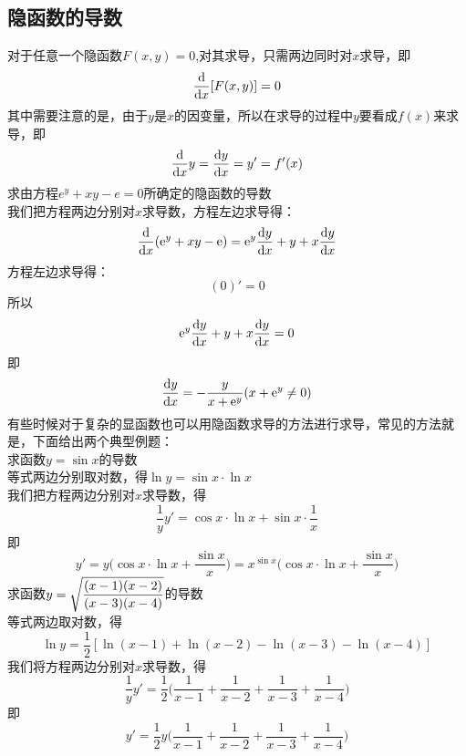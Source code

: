\subsection{隐函数的导数}
对于任意一个隐函数$F(x,y)=0$,对其求导，只需两边同时对$x$求导，即
\begin{equation}
	\frac{{\rm{d}}}{{\rm{d}} x}[F(x,y)]=0
\end{equation}
其中需要注意的是，由于$y$是$x$的因变量，所以在求导的过程中$y$要看成$f(x)$来求导，即
\begin{equation}
\frac{{\rm{d}}}{{\rm{d}} x}y=\frac{{\rm{d}} y}{{\rm{d}} x}=y'=f'(x)
\end{equation}
\examples 求由方程$e^y+xy-e=0$所确定的隐函数的导数
\\ \solve 我们把方程两边分别对$x$求导数，方程左边求导得：
\begin{equation}
	\nonumber
\frac{{\rm{d}}}{{\rm{d}} x}({\rm{e}}^y+xy-{\rm{e}})={\rm{e}}^y\frac{{\rm{d}} y}{{\rm{d}} x}+y+x\frac{{\rm{d}} y}{{\rm{d}} x}
\end{equation}
方程左边求导得：
\begin{equation}
	\nonumber
(0)'=0
\end{equation}
所以
\begin{equation}
	\nonumber
	{\rm{e}}^y\frac{{\rm{d}} y}{{\rm{d}} x}+y+x\frac{{\rm{d}} y}{{\rm{d}} x}=0
\end{equation}
即\begin{equation}
	\frac{{\rm{d}} y}{{\rm{d}} x}=-\frac{y}{x+{\rm{e}}^y}(x+{\rm{e}}^y\neq0)
\end{equation}
\kg 有些时候对于复杂的显函数也可以用隐函数求导的方法进行求导，常见的方法就是，下面给出两个典型例题：\vspace*{0.5em}\\
\examples 求函数$y=\sin x$的导数
\\ \solve 等式两边分别取对数，得$\ln y=\sin x\cdot \ln x$
\\我们把方程两边分别对$x$求导数，得
\begin{equation}
	\nonumber
\frac{1}{y}y'=\cos x\cdot \ln x+\sin x\cdot \frac{1}{x}
\end{equation}
即\begin{equation}
	\nonumber
	y'=y\bigg(\cos x\cdot \ln x+\frac{\sin x}{x}\bigg)=x^{\sin x}\bigg(\cos x\cdot \ln x+\frac{\sin x}{x}\bigg)
\end{equation}
\examples 求函数$y=\sqrt{\displaystyle\frac{(x-1)(x-2)}{(x-3)(x-4)}}$的导数
\\ \solve 等式两边取对数，得
\sj
\begin{equation}
	\nonumber
	\ln y=\frac{1}{2}[\ln(x-1)+\ln(x-2)-\ln(x-3)-\ln(x-4)]
\end{equation}
我们将方程两边分别对$x$求导数，得
\begin{equation}
	\nonumber
	\frac{1}{y}y'=\frac{1}{2}\bigg(\frac{1}{x-1}+\frac{1}{x-2}+\frac{1}{x-3}+\frac{1}{x-4}\bigg)
\end{equation}
即\begin{equation}
	\nonumber
	y'=\frac{1}{2}y\bigg(\frac{1}{x-1}+\frac{1}{x-2}+\frac{1}{x-3}+\frac{1}{x-4}\bigg)
\end{equation}
